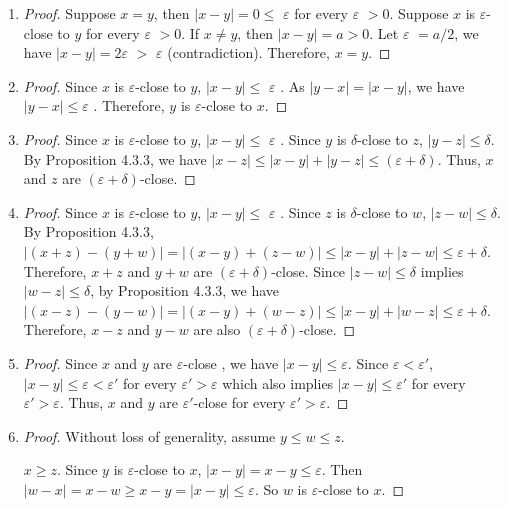 \documentclass[12pt, letter]{article}
\newcommand{\ec}{$\varepsilon$-close }
\newcommand{\dc}{$\delta$-close }
\newcommand{\ve}{$\varepsilon$ }
\begin{document}
\begin{enumerate}[label=(\alph*)]
    \item \begin{proof}
        Suppose $x=y$, then $|x-y|=0\leq$ \ve for every \ve $>0$. Suppose $x$ is \ec to $y$ for every \ve$>0$. If $x\ne y$, then $|x-y|=a>0$. Let \ve$=a/2$, we have
        $|x-y|=2$\ve$>$ \ve (contradiction). Therefore, $x=y$. 
    \end{proof}
    \item \begin{proof}
        Since $x$ is \ec to $y$, $|x-y|\leq $ \ve. As $|y-x|=|x-y|$, we have $|y-x|\leq $\ve. Therefore, $y$ is \ec to $x$.
    \end{proof}
    \item \begin{proof}
        Since $x$ is \ec to $y$, $|x-y|\leq$ \ve. Since $y$ is \dc to $z$, $|y-z|\leq \delta$. By Proposition 4.3.3, we have $|x-z|\leq |x-y|+|y-z|\leq 
        (\varepsilon+\delta)$. Thus, $x$ and $z$ are $(\varepsilon+\delta)$-close.
    \end{proof}
    \item \begin{proof}
        Since $x$ is \ec to $y$, $|x-y|\leq$ \ve. Since $z$ is \dc to $w$, $|z-w|\leq \delta$. By Proposition 4.3.3, $|(x+z)-(y+w)|=|(x-y)+(z-w)|\leq |x-y|+|z-w|\leq \varepsilon+\delta$.
        Therefore, $x+z$ and $y+w$ are $(\varepsilon+\delta)$-close. Since $|z-w|\leq \delta$ implies $|w-z|\leq \delta$, by Proposition 4.3.3, we have 
        $|(x-z)-(y-w)|=|(x-y)+(w-z)|\leq |x-y|+|w-z|\leq \varepsilon+\delta$. Therefore, $x-z$ and $y-w$ are also $(\varepsilon+\delta)$-close.
    \end{proof}
    \item \begin{proof}
        Since $x$ and $y$ are \ec, we have $|x-y|\leq \varepsilon$. Since $\varepsilon<\varepsilon'$, $|x-y|\leq\varepsilon<\varepsilon'$ for every $\varepsilon'>\varepsilon$ which also implies 
        $|x-y|\leq\varepsilon'$ for every $\varepsilon'>\varepsilon$. Thus, $x$ and $y$ are $\varepsilon'$-close for every $\varepsilon'>\varepsilon$. 
    \end{proof}
    \item \begin{proof}
        Without loss of generality, assume $y\leq w\leq z$. 
        
        $x\geq z$. Since $y$ is \ec to $x$, $|x-y|=x-y\leq\varepsilon$. Then $|w-x|=x-w\geq x-y=|x-y|\leq\varepsilon$. So $w$ is \ec to $x$.


\end{proof}
\end{enumerate}
\end{document}
